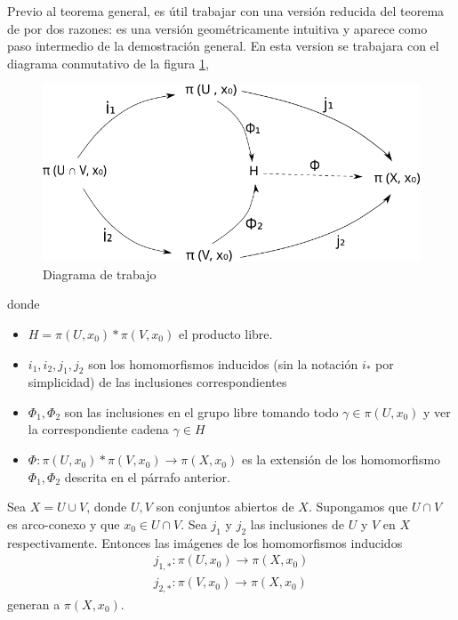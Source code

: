 Previo al teorema general, es útil trabajar con una versión reducida del
teorema de \vank por dos razones: es una versión geométricamente
intuitiva y aparece como paso intermedio de la demostración general. En
esta version se trabajara con el diagrama conmutativo de la figura
\ref{fig:digrama-vank},
\begin{figure}[h]
  \centering
  \includegraphics[scale=0.5]{./imagenes/van.png}
  \caption{Diagrama de trabajo \vank}
  \label{fig:digrama-vank}
\end{figure}
donde
\begin{itemize}
  \item \( H = \pi (U, x_0) * \pi (V, x_0)\) el producto libre.
  \item \(i_1, i_2, j_1, j_2\) son los homomorfismos inducidos (sin la notación
    \(i_*\) por simplicidad) de las inclusiones correspondientes
  \item \(\Phi_1, \Phi_2\) son las inclusiones en el grupo libre tomando todo
  \(\gamma \in \pi (U, x_0)\) y ver la correspondiente cadena \(\gamma
  \in H\)
  \item \(\Phi : \pi(U, x_0) * \pi (V, x_0) \to \pi (X, x_0)\) es la
  extensión de los homomorfismo \(\Phi_1, \Phi_2\) descrita en el
  párrafo anterior.
\end{itemize}
\begin{teorema} \label{thm:vank-especifico}
  Sea \(X = U \cup V\), donde \(U,V\) son conjuntos abiertos de \(X\).
  Supongamos que \(U \cap V\) es arco-conexo y que \(x_0 \in U \cap V\).
  Sea \(j_1\) y \(j_2\) las inclusiones de \(U\) y \(V\) en \(X\)
  respectivamente. Entonces las imágenes de los homomorfismos inducidos
  \begin{gather*}
    j_{1,*} : \pi (U, x_0) \to \pi (X, x_0) \\
    j_{2,*} : \pi (V, x_0) \to \pi (X, x_0)
  \end{gather*}
  generan a \(\pi (X,x_0)\).
\end{teorema}
